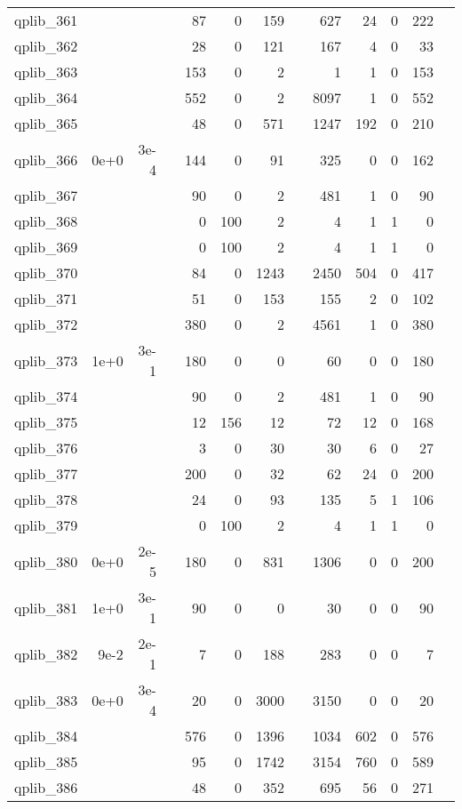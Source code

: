 \begin{table}
\begin{tabular}{lrrrrrrrrrrrr}
		qplib\_361	&		&		&	&	87	&	0	&	159	&	&	627	&	24	&	0	&	222	\\
qplib\_362	&		&		&	&	28	&	0	&	121	&	&	167	&	4	&	0	&	33	\\
qplib\_363	&		&		&	&	153	&	0	&	2	&	&	1	&	1	&	0	&	153	\\
qplib\_364	&		&		&	&	552	&	0	&	2	&	&	8097	&	1	&	0	&	552	\\
qplib\_365	&		&		&	&	48	&	0	&	571	&	&	1247	&	192	&	0	&	210	\\
qplib\_366	&	0e+0	&	3e-4	&	&	144	&	0	&	91	&	&	325	&	0	&	0	&	162	\\
qplib\_367	&		&		&	&	90	&	0	&	2	&	&	481	&	1	&	0	&	90	\\
qplib\_368	&		&		&	&	0	&	100	&	2	&	&	4	&	1	&	1	&	0	\\
qplib\_369	&		&		&	&	0	&	100	&	2	&	&	4	&	1	&	1	&	0	\\
qplib\_370	&		&		&	&	84	&	0	&	1243	&	&	2450	&	504	&	0	&	417	\\
qplib\_371	&		&		&	&	51	&	0	&	153	&	&	155	&	2	&	0	&	102	\\
qplib\_372	&		&		&	&	380	&	0	&	2	&	&	4561	&	1	&	0	&	380	\\
qplib\_373	&	1e+0	&	3e-1	&	&	180	&	0	&	0	&	&	60	&	0	&	0	&	180	\\
qplib\_374	&		&		&	&	90	&	0	&	2	&	&	481	&	1	&	0	&	90	\\
qplib\_375	&		&		&	&	12	&	156	&	12	&	&	72	&	12	&	0	&	168	\\
qplib\_376	&		&		&	&	3	&	0	&	30	&	&	30	&	6	&	0	&	27	\\
qplib\_377	&		&		&	&	200	&	0	&	32	&	&	62	&	24	&	0	&	200	\\
qplib\_378	&		&		&	&	24	&	0	&	93	&	&	135	&	5	&	1	&	106	\\
qplib\_379	&		&		&	&	0	&	100	&	2	&	&	4	&	1	&	1	&	0	\\
qplib\_380	&	0e+0	&	2e-5	&	&	180	&	0	&	831	&	&	1306	&	0	&	0	&	200	\\
qplib\_381	&	1e+0	&	3e-1	&	&	90	&	0	&	0	&	&	30	&	0	&	0	&	90	\\
qplib\_382	&	9e-2	&	2e-1	&	&	7	&	0	&	188	&	&	283	&	0	&	0	&	7	\\
qplib\_383	&	0e+0	&	3e-4	&	&	20	&	0	&	3000	&	&	3150	&	0	&	0	&	20	\\
qplib\_384	&		&		&	&	576	&	0	&	1396	&	&	1034	&	602	&	0	&	576	\\
qplib\_385	&		&		&	&	95	&	0	&	1742	&	&	3154	&	760	&	0	&	589	\\
qplib\_386	&		&		&	&	48	&	0	&	352	&	&	695	&	56	&	0	&	271	\\

\end{tabular}
\end{table}
